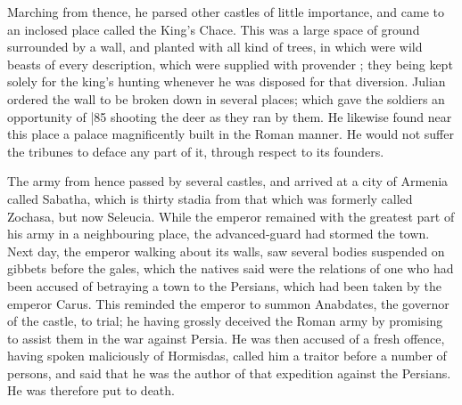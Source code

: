 Marching from thence, he parsed other castles of little importance, and came to an inclosed place called the King's Chace. This was a large space of ground surrounded by a wall, and planted with all kind of trees, in which were wild beasts of every description, which were supplied with provender ; they being kept solely for the king's hunting whenever he was disposed for
that diversion. Julian ordered the wall to be broken down in several places; which gave the soldiers an opportunity of
|85 shooting the deer as they ran by them. He likewise found near this place a palace magnificently built in the Roman manner. He would not suffer the tribunes to deface any part of it, through respect to its founders.

The army from hence passed by several castles, and arrived at a city of Armenia called Sabatha, which is thirty stadia from that which was formerly called Zochasa, but now Seleucia. While the emperor remained with the greatest part of his army in a neighbouring place, the advanced-guard had stormed the town. Next day, the emperor walking about its walls, saw several bodies suspended on gibbets before the gales, which the natives said were the relations of one who had been accused of betraying a town to the Persians, which had been taken by the emperor Carus. This reminded the emperor to summon Anabdates, the governor of the castle, to trial; he having grossly deceived the Roman army by promising to assist them in the war against Persia. He was then accused of a fresh offence, having spoken maliciously of Hormisdas, called him a traitor before a number of persons, and said that he was the author of that expedition against the Persians. He was therefore put to death.

